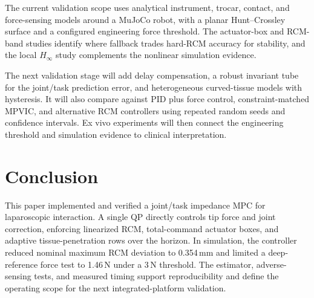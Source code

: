 The current validation scope uses analytical instrument, trocar, contact, and force-sensing models around a MuJoCo robot, with a planar Hunt--Crossley surface and a configured engineering force threshold. The actuator-box and RCM-band studies identify where fallback trades hard-RCM accuracy for stability, and the local $H_\infty$ study complements the nonlinear simulation evidence.

The next validation stage will add delay compensation, a robust invariant tube for the joint/task prediction error, and heterogeneous curved-tissue models with hysteresis. It will also compare against PID plus force control, constraint-matched MPVIC, and alternative RCM controllers using repeated random seeds and confidence intervals. Ex vivo experiments will then connect the engineering threshold and simulation evidence to clinical interpretation.

\section{Conclusion}

This paper implemented and verified a joint/task impedance MPC for laparoscopic interaction. A single QP directly controls tip force and joint correction, enforcing linearized RCM, total-command actuator boxes, and adaptive tissue-penetration rows over the horizon. In simulation, the controller reduced nominal maximum RCM deviation to 0.354\,mm and limited a deep-reference force test to 1.46\,N under a 3\,N threshold. The estimator, adverse-sensing tests, and measured timing support reproducibility and define the operating scope for the next integrated-platform validation.

